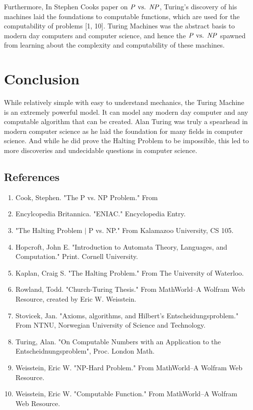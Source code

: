 \documentclass[12pt]{article}
\begin{document}
Furthermore, In Stephen Cooks paper on $\text{\textit{P} vs. \textit{NP}}$, Turing's discovery of his machines laid the foundations to computable functions, which are used for the computability of problems [1, 10]. Turing Machines was the abstract basis to modern day computers and computer science, and hence the $\text{\textit{P} vs. \textit{NP}}$ spawned from learning about the complexity and computability of these machines.

\section{Conclusion}

While relatively simple with easy to understand mechanics, the Turing Machine is an extremely powerful model. It can model any modern day computer and any computable algorithm that can be created. Alan Turing was truly a spearhead in modern computer science as he laid the foundation for many fields in computer science. And while he did prove the Halting Problem to be impossible, this led to more discoveries and undecidable questions in computer science.

\begin{center}
\section*{References}
\end{center}
\begin{enumerate}
\item Cook, Stephen. "The P vs. NP Problem." From 
\item Encylcopedia Britannica. "ENIAC." Encyclopedia Entry.
\item "The Halting Problem $\mid$ P vs. NP." From Kalamazoo University, CS 105.
\item Hopcroft, John E. "Introduction to Automata Theory, Languages, and Computation." Print. Cornell University.
\item Kaplan, Craig S. "The Halting Problem." From The University of Waterloo.
\item Rowland, Todd. "Church-Turing Thesis." From MathWorld--A Wolfram Web Resource, created by Eric W. Weisstein.
\item Stovicek, Jan. "Axioms, algorithms, and Hilbert's Entscheidungsproblem." From NTNU, Norwegian University of Science and Technology.
\item Turing, Alan. "On Computable Numbers with an Application to the Entscheidnungsproblem", Proc. London Math.
\item Weisstein, Eric W. "NP-Hard Problem." From MathWorld--A Wolfram Web Resource.
\item Weisstein, Eric W. "Computable Function." From MathWorld--A Wolfram Web Resource.


\end{enumerate}
\end{document}
